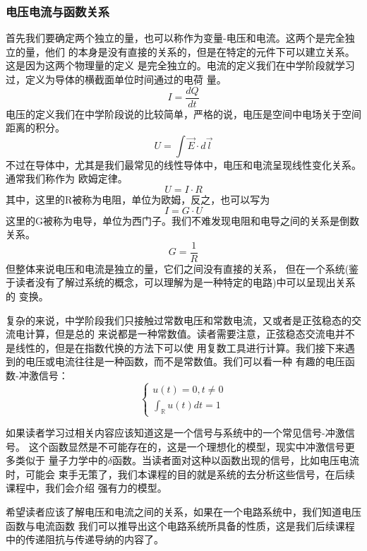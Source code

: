     \subsubsection{电压电流与函数关系}
    首先我们要确定两个独立的量，也可以称作为变量-电压和电流。这两个是完全独立的量，他们
    的本身是没有直接的关系的，但是在特定的元件下可以建立关系。这是因为这两个物理量的定义
    是完全独立的。电流的定义我们在中学阶段就学习过，定义为导体的横截面单位时间通过的电荷
    量。$$ I = \frac{dQ}{dt} $$
    电压的定义我们在中学阶段说的比较简单，严格的说，电压是空间中电场关于空间距离的积分。
    $$ U = \int \vec{E} \cdot d\vec{l} $$
    不过在导体中，尤其是我们最常见的线性导体中，电压和电流呈现线性变化关系。通常我们称作为
    欧姆定律。$$ U = I \cdot R $$
    其中，这里的R被称为电阻，单位为欧姆，反之，也可以写为$$ I = G \cdot U $$
    这里的G被称为电导，单位为西门子。我们不难发现电阻和电导之间的关系是倒数关系。
    $$ G = \frac{1}{R} $$
    但整体来说电压和电流是独立的量，它们之间没有直接的关系，
    但在一个系统(鉴于读者没有了解过系统的概念，可以理解为是一种特定的电路)中可以呈现出关系的
    变换。

    复杂的来说，中学阶段我们只接触过常数电压和常数电流，又或者是正弦稳态的交流电计算，但是总的
    来说都是一种常数值。读者需要注意，正弦稳态交流电并不是线性的，但是在指数代换的方法下可以使
    用复数工具进行计算。我们接下来遇到的电压或电流往往是一种函数，而不是常数值。我们可以看一种
    有趣的电压函数-冲激信号：
    $$
    \left\{
    \begin{aligned}
        u(t) = 0, t \neq 0 \\
        \int_{\mathbb{R}}  u(t) dt = 1
    \end{aligned}
    \right.
    $$

    \figImpulseFuncGraph

    如果读者学习过相关内容应该知道这是一个信号与系统中的一个常见信号-冲激信号。
    这个函数显然是不可能存在的，这是一个理想化的模型，现实中冲激信号更多类似于
    量子力学中的$\delta$函数。当读者面对这种以函数出现的信号，比如电压电流时，可能会
    束手无策了，我们本课程的目的就是系统的去分析这些信号，在后续课程中，我们会介绍
    强有力的模型。
    
    希望读者应该了解电压和电流之间的关系，如果在一个电路系统中，我们知道电压函数与电流函数
    我们可以推导出这个电路系统所具备的性质，这是我们后续课程中的传递阻抗与传递导纳的内容了。

